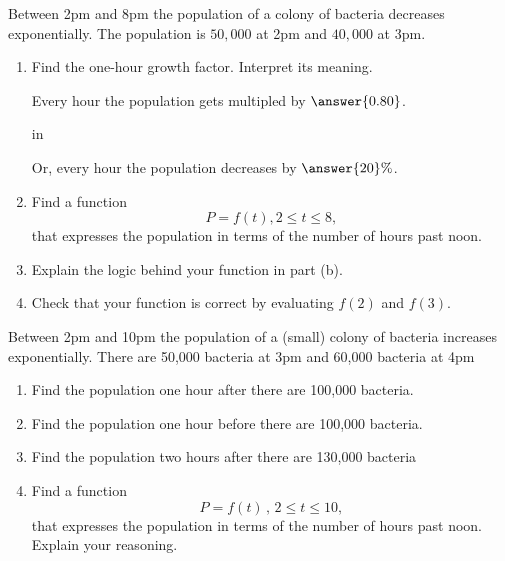 \documentclass{ximera}
\newcommand{\pskip}{\vskip 0.1 in}
\begin{document}
\begin{example}  \label{Ex432234e3r}
Between 2pm and 8pm the population of a colony of bacteria decreases exponentially. The population is $50,000$ at 2pm and $40,000$ at 3pm.

\begin{enumerate}
\item Find the one-hour growth factor. Interpret its meaning.

Every hour the population gets multipled by $\answer{0.80}$.

\pskip

Or, every hour the population decreases by $\answer{20}\%$.

\item Find a function
\[
        P = f(t) , 2\leq t \leq 8 ,   
\] 
that expresses the population in terms of the number of hours past noon.

\item Explain the logic behind your function in part (b).

\item Check that your function is correct by evaluating $f(2)$ and $f(3)$.
\end{enumerate}
\end{example}


\begin{example}  \label{Ex4556511111}
Between 2pm and 10pm the population of a (small) colony of bacteria increases exponentially. There are 50,000 bacteria at 3pm and 60,000 bacteria at 4pm

\begin{enumerate}
\item Find the population one hour after there are 100,000 bacteria.

\item Find the population one hour before there are 100,000 bacteria.

\item Find the population two hours after there are 130,000 bacteria

\item Find a function 
\[
      P = f(t) \, , \, 2\leq t \leq 10 ,
\]
that expresses the population in terms of the number of hours past noon. Explain your reasoning.
\end{enumerate}
\end{example}
\end{document}
